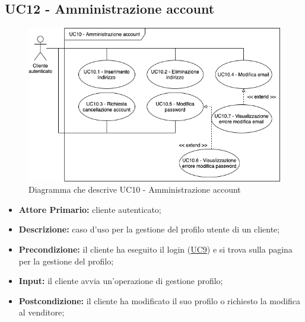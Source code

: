 \subsection{UC12 - Amministrazione account}
\label{UC12}
\begin{figure}[H]
    \centering
    \includegraphics[width=\linewidth]{res/images/UC/UC10.png}
    \caption{Diagramma che descrive UC10 - Amministrazione account} 
\end{figure}
\begin{itemize}
    \item \textbf{Attore Primario:} cliente autenticato;
    \item \textbf{Descrizione:} caso d'uso per la gestione del profilo utente di un cliente;
    \item \textbf{Precondizione:} il cliente ha eseguito il login (\hyperref[UC9]{UC9}) e si trova sulla pagina per la gestione del profilo;
    \item \textbf{Input:} il cliente avvia un'operazione di gestione profilo;
    \item \textbf{Postcondizione:} il cliente ha modificato il suo profilo o richiesto la modifica al venditore;
\end{itemize}

